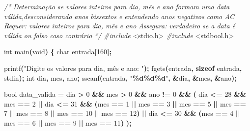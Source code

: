 \documentclass[
  11pt,
  a4paper,
]{scrbook}
\newenvironment{Shaded}{\begin{snugshade}}{\end{snugshade}}
\newcommand{\CommentTok}[1]{\textcolor[rgb]{0.56,0.35,0.01}{\textit{#1}}}
\newcommand{\DataTypeTok}[1]{\textcolor[rgb]{0.13,0.29,0.53}{#1}}
\newcommand{\DecValTok}[1]{\textcolor[rgb]{0.00,0.00,0.81}{#1}}
\newcommand{\ImportTok}[1]{#1}
\newcommand{\KeywordTok}[1]{\textcolor[rgb]{0.13,0.29,0.53}{\textbf{#1}}}
\newcommand{\NormalTok}[1]{#1}
\newcommand{\OperatorTok}[1]{\textcolor[rgb]{0.81,0.36,0.00}{\textbf{#1}}}
\newcommand{\PreprocessorTok}[1]{\textcolor[rgb]{0.56,0.35,0.01}{\textit{#1}}}
\newcommand{\SpecialCharTok}[1]{\textcolor[rgb]{0.81,0.36,0.00}{\textbf{#1}}}
\newcommand{\StringTok}[1]{\textcolor[rgb]{0.31,0.60,0.02}{#1}}
\begin{document}
\begin{Shaded}
\begin{Highlighting}[]
\CommentTok{/*}
\CommentTok{Determinação se valores inteiros para dia, mês e ano formam uma data}
\CommentTok{válida,desconsiderando anos bissextos e entendendo anos negativos como AC}
\CommentTok{Requer: valores inteiros para dia, mês e ano}
\CommentTok{Assegura: verdadeiro se a data é válida ou falso caso contrário}
\CommentTok{*/}
\PreprocessorTok{\#include }\ImportTok{\textless{}stdio.h\textgreater{}}
\PreprocessorTok{\#include }\ImportTok{\textless{}stdbool.h\textgreater{}}

\DataTypeTok{int}\NormalTok{ main}\OperatorTok{(}\DataTypeTok{void}\OperatorTok{)} \OperatorTok{\{}
    \DataTypeTok{char}\NormalTok{ entrada}\OperatorTok{[}\DecValTok{160}\OperatorTok{];}
    
\NormalTok{    printf}\OperatorTok{(}\StringTok{"Digite os valores para dia, mês e ano: "}\OperatorTok{);}
\NormalTok{    fgets}\OperatorTok{(}\NormalTok{entrada}\OperatorTok{,} \KeywordTok{sizeof}\NormalTok{ entrada}\OperatorTok{,}\NormalTok{ stdin}\OperatorTok{);}
    \DataTypeTok{int}\NormalTok{ dia}\OperatorTok{,}\NormalTok{ mes}\OperatorTok{,}\NormalTok{ ano}\OperatorTok{;}
\NormalTok{    sscanf}\OperatorTok{(}\NormalTok{entrada}\OperatorTok{,} \StringTok{"}\SpecialCharTok{\%d\%d\%d}\StringTok{"}\OperatorTok{,} \OperatorTok{\&}\NormalTok{dia}\OperatorTok{,} \OperatorTok{\&}\NormalTok{mes}\OperatorTok{,} \OperatorTok{\&}\NormalTok{ano}\OperatorTok{);}

    \DataTypeTok{bool}\NormalTok{ data\_valida }\OperatorTok{=}\NormalTok{ dia }\OperatorTok{\textgreater{}} \DecValTok{0} \OperatorTok{\&\&}\NormalTok{ mes }\OperatorTok{\textgreater{}} \DecValTok{0} \OperatorTok{\&\&}\NormalTok{ ano }\OperatorTok{!=} \DecValTok{0} \OperatorTok{\&\&} \OperatorTok{(}
\NormalTok{            dia }\OperatorTok{\textless{}=} \DecValTok{28} \OperatorTok{\&\&}\NormalTok{ mes }\OperatorTok{==} \DecValTok{2} \OperatorTok{||}
\NormalTok{            dia }\OperatorTok{\textless{}=} \DecValTok{31} \OperatorTok{\&\&} \OperatorTok{(}\NormalTok{mes }\OperatorTok{==} \DecValTok{1} \OperatorTok{||}\NormalTok{ mes }\OperatorTok{==} \DecValTok{3} \OperatorTok{||}\NormalTok{ mes }\OperatorTok{==} \DecValTok{5} \OperatorTok{||}\NormalTok{ mes }\OperatorTok{==} \DecValTok{7} \OperatorTok{||}
\NormalTok{                mes }\OperatorTok{==} \DecValTok{8} \OperatorTok{||}\NormalTok{ mes }\OperatorTok{==} \DecValTok{10} \OperatorTok{||}\NormalTok{ mes }\OperatorTok{==} \DecValTok{12}\OperatorTok{)} \OperatorTok{||}
\NormalTok{            dia }\OperatorTok{\textless{}=} \DecValTok{30} \OperatorTok{\&\&} \OperatorTok{(}\NormalTok{mes }\OperatorTok{==} \DecValTok{4} \OperatorTok{||}\NormalTok{ mes }\OperatorTok{==} \DecValTok{6} \OperatorTok{||}\NormalTok{ mes }\OperatorTok{==} \DecValTok{9} \OperatorTok{||}\NormalTok{ mes }\OperatorTok{==} \DecValTok{11}\OperatorTok{)}
        \OperatorTok{);}


\end{Highlighting}
\end{Shaded}
\end{document}

